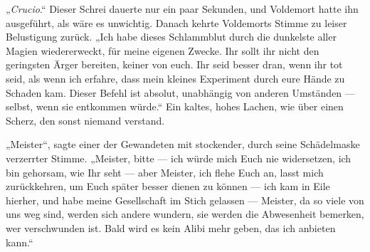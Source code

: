 „\emph{Crucio}.“
Dieser Schrei dauerte nur ein paar Sekunden, und Voldemort hatte ihn ausgeführt, als wäre es unwichtig. Danach kehrte Voldemorts Stimme zu leiser Belustigung zurück.
„Ich habe dieses Schlammblut durch die dunkelste aller Magien wiedererweckt, für meine eigenen Zwecke. Ihr sollt ihr nicht den geringsten Ärger bereiten, keiner von euch. Ihr seid besser dran, wenn ihr tot seid, als wenn ich erfahre, dass mein kleines Experiment durch eure Hände zu Schaden kam. Dieser Befehl ist absolut, unabhängig von anderen Umständen — selbst, wenn sie entkommen würde.“
Ein kaltes, hohes Lachen, wie über einen Scherz, den sonst niemand verstand.

„Meister“, sagte einer der Gewandeten mit stockender, durch seine Schädelmaske verzerrter Stimme.
„Meister, bitte — ich würde mich Euch nie widersetzen, ich bin gehorsam, wie Ihr seht — aber Meister, ich flehe Euch an, lasst mich zurückkehren, um Euch später besser dienen zu können — ich kam in Eile hierher, und habe meine Gesellschaft im Stich gelassen — Meister, da so viele von uns weg sind, werden sich andere wundern, sie werden die Abwesenheit bemerken, wer verschwunden ist. Bald wird es kein Alibi mehr geben, das ich anbieten kann.“

